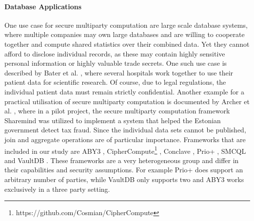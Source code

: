 \paragraph{Database Applications}
One use case for secure multiparty computation are large scale database systems, where multiple companies may own large databases and are willing to cooperate together and compute shared statistics over their combined data. Yet they cannot afford to disclose individual records, as these may contain highly sensitive personal information or highly valuable trade secrets. One such use case is described by Bater et al. \cite{bater}, where several hospitals work together to use their patient data for scientific research. Of course, due to legal regulations, the individual patient data must remain strictly confidential. Another example for a practical utilisation of secure multiparty computation is documented by Archer et al. \cite{Archer2018FromKT}, where in a pilot project, the secure multiparty computation framework Sharemind \cite{bogdanov2015estonian} was utilized to implement a system that helped the Estonian government detect tax fraud. Since the individual data sets cannot be published, join and aggregate operations are of particular importance. Frameworks that are included in our study are ABY3 \cite{mohassel2020fast}, CipherCompute\footnote{https://github.com/Cosmian/CipherCompute} , Conclave \cite{10.1145/3302424.3303982}, Prio+ \cite{cryptoeprint:2021:576} , SMCQL \cite{bater} and VaultDB \cite{rogers2022vaultdb}. These frameworks are a very heterogeneous group and differ in their capabilities and security assumptions. For example Prio+ does support an arbitrary number of parties, while VaultDB only supports two and ABY3 works exclusively in a three party setting.












